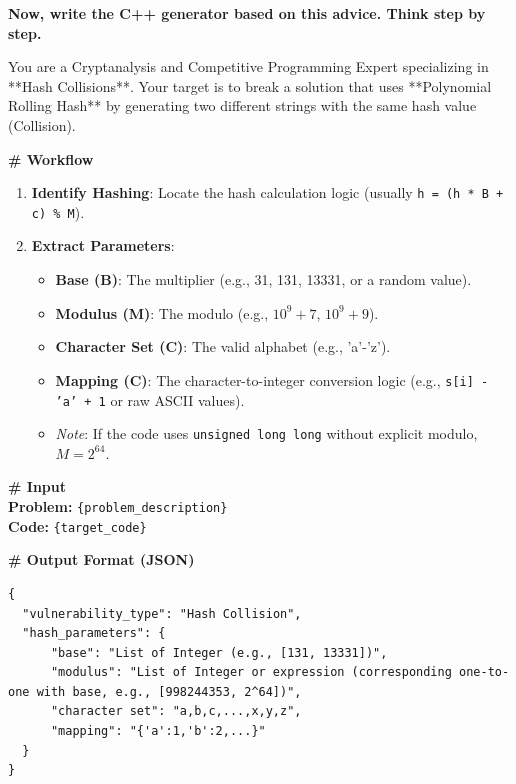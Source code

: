 \documentclass[11pt]{article}
\begin{document}
\begin{promptbox}
\vspace{0.5em}
\noindent\textbf{Now, write the C++ generator based on this advice. Think step by step.}

\end{promptbox}

\begin{promptbox}
\small
You are a Cryptanalysis and Competitive Programming Expert specializing in **Hash Collisions**.
Your target is to break a solution that uses **Polynomial Rolling Hash** by generating two different strings with the same hash value (Collision).

\vspace{0.5em}
\noindent\textbf{\# Workflow}
\begin{enumerate}
    \setlength\itemsep{0em}
    \item \textbf{Identify Hashing}: Locate the hash calculation logic (usually \texttt{h = (h * B + c) \% M}).
    \item \textbf{Extract Parameters}:
    \begin{itemize}
        \item \textbf{Base (B)}: The multiplier (e.g., 31, 131, 13331, or a random value).
        \item \textbf{Modulus (M)}: The modulo (e.g., $10^9+7$, $10^9+9$).
        \item \textbf{Character Set (C)}: The valid alphabet (e.g., 'a'-'z').
        \item \textbf{Mapping (C)}: The character-to-integer conversion logic (e.g., \texttt{s[i] - 'a' + 1} or raw ASCII values).
        \item \textit{Note}: If the code uses \texttt{unsigned long long} without explicit modulo, $M = 2^{64}$.
    \end{itemize}
\end{enumerate}

\noindent\textbf{\# Input} \\
\textbf{Problem:} \texttt{\{problem\_description\}} \\
\textbf{Code:} \texttt{\{target\_code\}}

\vspace{0.5em}
\noindent\textbf{\# Output Format (JSON)}
\begin{lstlisting}[style=jsonstyle]
{
  "vulnerability_type": "Hash Collision",
  "hash_parameters": {
      "base": "List of Integer (e.g., [131, 13331])",
      "modulus": "List of Integer or expression (corresponding one-to-one with base, e.g., [998244353, 2^64])",
      "character set": "a,b,c,...,x,y,z",
      "mapping": "{'a':1,'b':2,...}"
  }
}
\end{lstlisting}
\end{promptbox}
\end{document}
